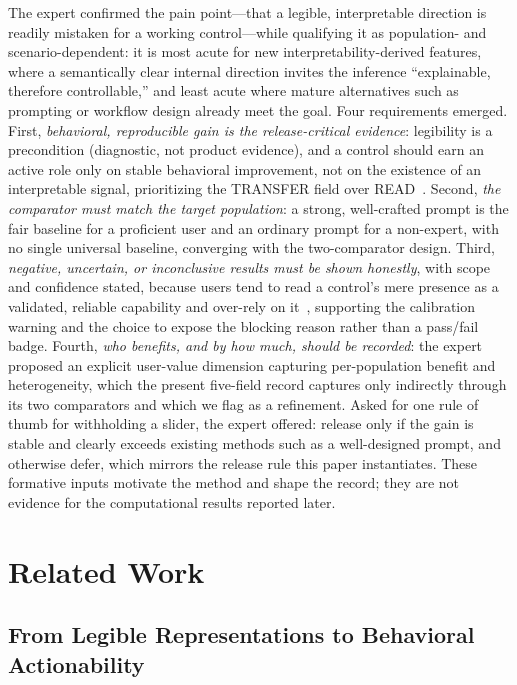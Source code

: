 \documentclass[manuscript,review,anonymous]{acmart}
\begin{document}
The expert confirmed the pain point---that a legible, interpretable direction is readily mistaken for a working control---while qualifying it as population- and scenario-dependent: it is most acute for new interpretability-derived features, where a semantically clear internal direction invites the inference ``explainable, therefore controllable,'' and least acute where mature alternatives such as prompting or workflow design already meet the goal. Four requirements emerged. First, \emph{behavioral, reproducible gain is the release-critical evidence}: legibility is a precondition (diagnostic, not product evidence), and a control should earn an active role only on stable behavioral improvement, not on the existence of an interpretable signal, prioritizing the TRANSFER field over READ~\cite{bucinca2020proxy}. Second, \emph{the comparator must match the target population}: a strong, well-crafted prompt is the fair baseline for a proficient user and an ordinary prompt for a non-expert, with no single universal baseline, converging with the two-comparator design. Third, \emph{negative, uncertain, or inconclusive results must be shown honestly}, with scope and confidence stated, because users tend to read a control's mere presence as a validated, reliable capability and over-rely on it~\cite{lee2004trust,schemmer2023appropriate,vasconcelos2023explanations,passi2022overreliance}, supporting the calibration warning and the choice to expose the blocking reason rather than a pass/fail badge. Fourth, \emph{who benefits, and by how much, should be recorded}: the expert proposed an explicit user-value dimension capturing per-population benefit and heterogeneity, which the present five-field record captures only indirectly through its two comparators and which we flag as a refinement. Asked for one rule of thumb for withholding a slider, the expert offered: release only if the gain is stable and clearly exceeds existing methods such as a well-designed prompt, and otherwise defer, which mirrors the release rule this paper instantiates. These formative inputs motivate the method and shape the record; they are not evidence for the computational results reported later.

\section{Related Work}\label{related-work}

\subsection{From Legible Representations to Behavioral Actionability}\label{from-legible-representations-to-behavioral-actionability}
\end{document}

